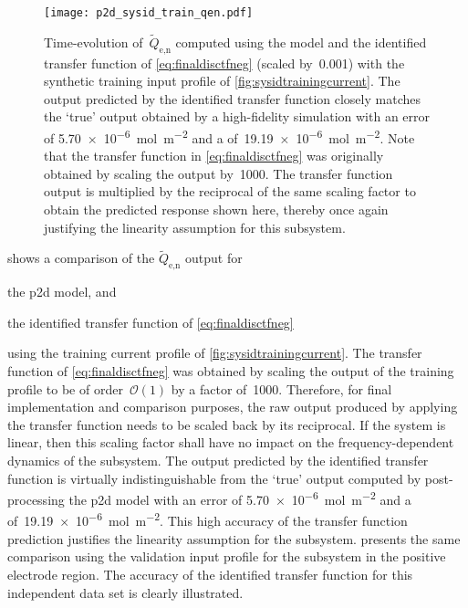 \begin{figure}[!htbp]
    \centering
    \texttt{[image: p2d\_sysid\_train\_qen.pdf]}
    \caption[$\widetilde{Q}_{\text{e,n}}(t)$ outputs from  and
    identified transfer function for training profile]{%
        Time-evolution of~$\widetilde{Q}_{\text{e,n}}$ computed using the
         model  and the identified transfer function
        of \cref{eq:finaldisctfneg} (scaled by~0.001) with the synthetic
        training input profile of \cref{fig:sysidtrainingcurrent}. The output
        predicted by the identified transfer function closely matches the `true'
        output obtained by a high-fidelity  simulation with an
         error of \SI{5.70e-6}{\mole\per\meter\squared} and a
         of~\SI{19.19e-6}{\mole\per\meter\squared}. Note that the
        transfer function in \cref{eq:finaldisctfneg} was originally obtained by
        scaling the output by~1000. The transfer function output is
        multiplied by the reciprocal of the same scaling factor to obtain the
        predicted response shown here, thereby once again justifying the
        linearity assumption for this subsystem.
    }%
    \label{fig:tfpredQentrain}
\end{figure}

 shows a comparison of the $\widetilde{Q}_{\text{e,n}}$
output for
\begin{enumerate*}[label=\emph{\alph*})]
    \item the \gls{p2d} model, and
    \item the identified transfer function of \cref{eq:finaldisctfneg}
\end{enumerate*}
using  the  training  current  profile  of \cref{fig:sysidtrainingcurrent}.  The
transfer function of \cref{eq:finaldisctfneg} was obtained by scaling the output
of the  training profile to  be of order~$\mathcal{O}(1)$  by a factor  of~1000.
Therefore,  for final  implementation and  comparison purposes,  the raw  output
produced  by applying  the transfer  function  needs to  be scaled  back by  its
reciprocal. If  the system  is linear,  then this scaling  factor shall  have no
impact  on  the  frequency-dependent  dynamics  of  the  subsystem.  The  output
predicted  by the  identified transfer  function is  virtually indistinguishable
from  the `true'  output computed  by post-processing  the \gls{p2d}  model with
an    error   of  \SI{5.70e-6}{\mole\per\meter\squared}  and  a
 of~\SI{19.19e-6}{\mole\per\meter\squared}.  This high accuracy
of the transfer  function prediction justifies the linearity  assumption for the
subsystem.    presents  the  same  comparison  using  the
validation input profile for the subsystem in the positive electrode region. The
accuracy of  the identified transfer function  for this independent data  set is
clearly illustrated.

